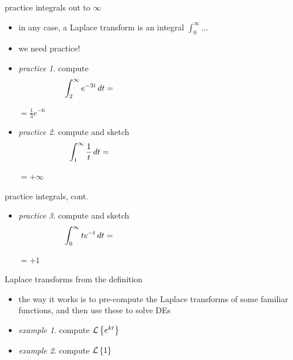 \documentclass[urlcolor=blue,dvipsnames]{beamer}
\begin{document}
\begin{frame}{practice integrals out to $\infty$}

\begin{itemize}
\item in any case, a Laplace transform is an integral $\int_0^\infty \dots$
\item we need practice!
\item \emph{practice 1}.  compute
    $$\int_2^\infty e^{-3t}\,dt = \hspace{60mm}$$

\vspace{10mm}
\hfill $=\frac{1}{3} e^{-6}$
\item \emph{practice 2}.  compute and sketch
    $$\int_1^\infty \frac{1}{t}\,dt = \hspace{60mm}$$

\vspace{10mm}
\hfill $=+\infty$
\end{itemize}
\end{frame}


\begin{frame}{practice integrals, cont.}

\begin{itemize}
\item \emph{practice 3}.  compute and sketch
    $$\int_0^\infty t e^{-t}\,dt = \hspace{60mm}$$

\vspace{20mm}
\hfill $=+1$

\vspace{10mm}
\end{itemize}
\end{frame}


\begin{frame}{Laplace transforms from the definition}

\begin{itemize}
\item the way it works is to pre-compute the Laplace transforms of some familiar functions, and then use these to solve DEs
\item \emph{example 1}.  compute $\mathcal{L}\left\{e^{kt}\right\}$

\vspace{30mm}
\item \emph{example 2}.  compute $\mathcal{L}\left\{1\right\}$

\vspace{25mm}
\end{itemize}
\end{frame}
\end{document}
